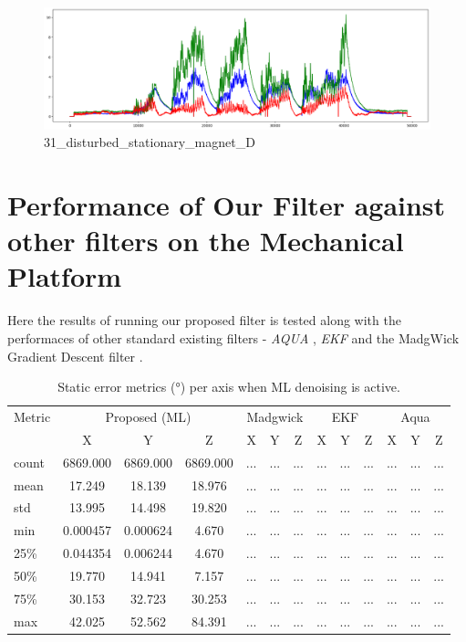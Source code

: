 \documentclass{iutbscthesis}
\begin{document}
\begin{figure}[H]
    \centering
    \includegraphics[width=0.9\linewidth]{figures/31_disturbed_stationary_magnet_D.png}
    \caption{31\_disturbed\_stationary\_magnet\_D}
    \label{fig:31_disturbed_stationary_magnet_D}
\end{figure}

\section{Performance of Our Filter against other filters on the Mechanical Platform} \label{section:mechanical_platform_result}
Here the results of running our proposed filter is tested along with the performaces of 
other standard existing filters - \emph{AQUA} \cite{aqua_ref}, \emph{EKF} \cite{ekf_ref} and the 
MadgWick Gradient Descent filter \cite{madgwick2011estimation}. 


 
\begin{table}[ht]
\centering
\caption{Static error metrics (°) per axis when ML denoising is active.}
\label{tab:static_ml}
\begin{tabular}{l
  *{4}{ccc}
}
\toprule
Metric & \multicolumn{3}{c}{Proposed (ML)} & \multicolumn{3}{c}{Madgwick} & \multicolumn{3}{c}{EKF} & \multicolumn{3}{c}{Aqua} \\
 & X & Y & Z & X & Y & Z & X & Y & Z & X & Y & Z \\
\midrule
count & 6869.000 & 6869.000 & 6869.000 & ... & ... & ... & ... & ... & ... & ... & ... & ... \\
mean & 17.249 & 18.139 & 18.976 & ... & ... & ... & ... & ... & ... & ... & ... & ... \\
std & 13.995 & 14.498 & 19.820 & ... & ... & ... & ... & ... & ... & ... & ... & ... \\
min & 0.000457 & 0.000624 & 4.670 & ... & ... & ... & ... & ... & ... & ... & ... & ... \\
25\% & 0.044354 & 0.006244 & 4.670 & ... & ... & ... & ... & ... & ... & ... & ... & ... \\
50\% & 19.770 & 14.941 & 7.157 & ... & ... & ... & ... & ... & ... & ... & ... & ... \\
75\% & 30.153 & 32.723 & 30.253 & ... & ... & ... & ... & ... & ... & ... & ... & ... \\
max & 42.025 & 52.562 & 84.391 & ... & ... & ... & ... & ... & ... & ... & ... & ... \\
\bottomrule
\end{tabular}
\end{table}
\end{document}
